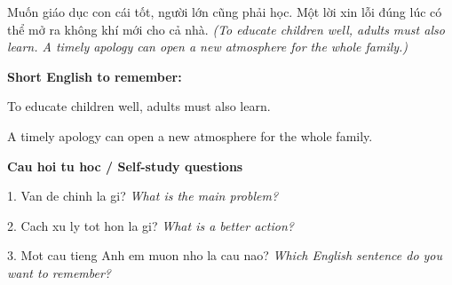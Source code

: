 \begin{baihoc}
Muốn giáo dục con cái tốt, người lớn cũng phải học. Một lời xin lỗi đúng lúc có thể mở ra không khí mới cho cả nhà.
\textit{(To educate children well, adults must also learn. A timely apology can open a new atmosphere for the whole family.)}
\end{baihoc}

\begin{ghinhoanh}
\textbf{Short English to remember:}

To educate children well, adults must also learn.

A timely apology can open a new atmosphere for the whole family.

\end{ghinhoanh}

\begin{tuhocnhanh}
\textbf{Cau hoi tu hoc / Self-study questions}

1. Van de chinh la gi? \textit{What is the main problem?}

2. Cach xu ly tot hon la gi? \textit{What is a better action?}

3. Mot cau tieng Anh em muon nho la cau nao? \textit{Which English sentence do you want to remember?}
\end{tuhocnhanh}
